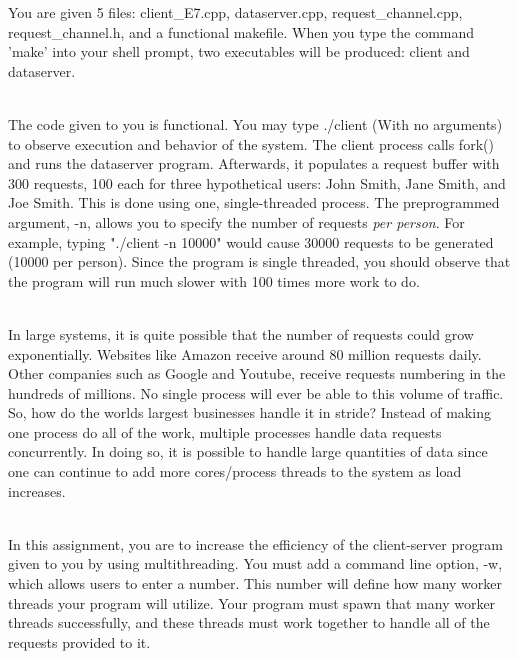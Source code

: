 \documentclass[12pt]{extarticle}
\newenvironment{myindentpar}[1]%
 {\begin{list}{}%
         {\setlength{\leftmargin}{#1}}%
         \item[]%
 }
 {\end{list}}
\begin{document}
\begin{myindentpar}{5mm}

	You are given 5 files: client\_E7.cpp, dataserver.cpp, request\_channel.cpp, request\_channel.h, and a functional makefile. When you type the command 'make' into your shell prompt, two executables will be produced: client and dataserver.  
	
	\ \\
	The code given to you is functional.  You may type ./client (With no arguments) to observe execution and behavior of the system. The client process calls fork() and runs the dataserver program.  Afterwards, it populates a request buffer with 300 requests, 100 each for three hypothetical users: John Smith, Jane Smith, and Joe Smith. This is done using one, single-threaded process.  The preprogrammed argument, -n, allows you to specify the number of requests \emph{per person}.  For example, typing "./client -n 10000" would cause 30000 requests to be generated (10000 per person).  Since the program is single threaded, you should observe that the program will run much slower with 100 times more work to do.  
	
	\ \\
	In large systems, it is quite possible that the number of requests could grow exponentially.  Websites like Amazon receive around 80 million requests daily.  Other companies such as Google and Youtube, receive requests numbering in the hundreds of millions.  No single process will ever be able to this volume of traffic.  So, how do the worlds largest businesses handle it in stride?  Instead of making one process do all of the work, multiple processes handle data requests concurrently.  In doing so, it is possible to handle large quantities of data since one can continue to add more cores/process threads to the system as load increases.  
	
	\ \\
	In this assignment, you are to increase the efficiency of the client-server program given to you by using multithreading.  You must add a command line option, -w, which allows users to enter a number.  This number will define how many worker threads your program will utilize.  Your program must spawn that many worker threads successfully, and these threads must work together to handle all of the requests provided to it.
	

\end{myindentpar}
\end{document}
